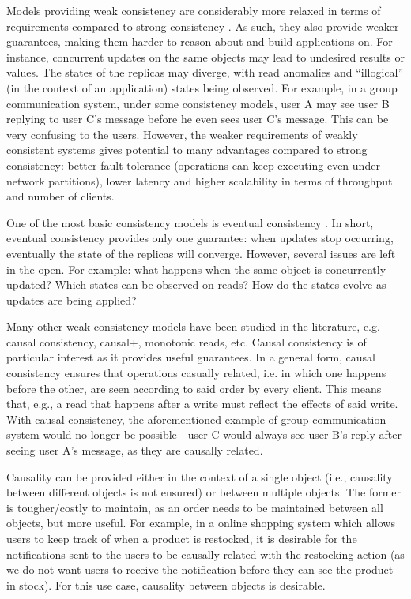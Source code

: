 Models providing weak consistency are considerably more relaxed in terms of requirements compared to strong consistency \cite{understandingEC}.
As such, they also provide weaker guarantees, making them harder to reason about and build applications on.
For instance, concurrent updates on the same objects may lead to undesired results or values.
The states of the replicas may diverge, with read anomalies and ``illogical'' (in the context of an application) states being observed.
For example, in a group communication system, under some consistency models, user A may see user B replying to user C's message before he even sees user C's message.
This can be very confusing to the users.
However, the weaker requirements of weakly consistent systems gives potential to many advantages compared to strong consistency: better fault tolerance (operations can keep executing even under network partitions), lower latency and higher scalability in terms of throughput and number of clients.

One of the most basic consistency models is eventual consistency \cite{understandingEC}.
In short, eventual consistency provides only one guarantee: when updates stop occurring, eventually the state of the replicas will converge.
However, several issues are left in the open. For example: what happens when the same object is concurrently updated? Which states can be observed on reads? How do the states evolve as updates are being applied?

Many other weak consistency models have been studied in the literature, e.g. causal consistency, causal+, monotonic reads, etc.
Causal consistency is of particular interest as it provides useful guarantees.
In a general form, causal consistency ensures that operations casually related, i.e. in which one happens before the other, are seen according to said order by every client.
This means that, e.g., a read that happens after a write must reflect the effects of said write.
With causal consistency, the aforementioned example of group communication system would no longer be possible - user C would always see user B's reply after seeing user A's message, as they are causally related.


Causality can be provided either in the context of a single object (i.e., causality between different objects is not ensured) or between multiple objects.
The former is tougher/costly to maintain, as an order needs to be maintained between all objects, but more useful.
For example, in a online shopping system which allows users to keep track of when a product is restocked, it is desirable for the notifications sent to the users to be causally related with the restocking action (as we do not want users to receive the notification before they can see the product in stock).
For this use case, causality between objects is desirable.

